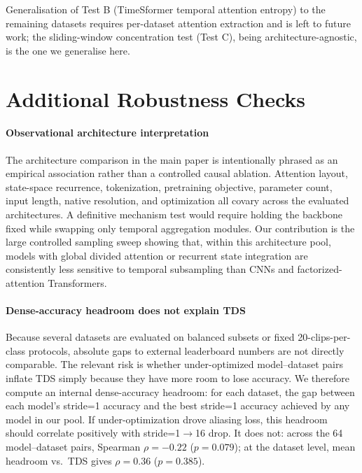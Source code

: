 \documentclass[a4paper, 10pt, conference, onecolumn]{ieeeconf}
\newcommand{\TDS}{\textsc{TDS}}
\begin{document}
Generalisation of Test B (TimeSformer temporal attention entropy) to the remaining datasets requires per-dataset attention extraction and is left to future work; the sliding-window concentration test (Test C), being architecture-agnostic, is the one we generalise here.

\section{Additional Robustness Checks}
\label{sec:sup_extra_checks}

\paragraph{Observational architecture interpretation}
The architecture comparison in the main paper is intentionally phrased as an empirical association rather than a controlled causal ablation. Attention layout, state-space recurrence, tokenization, pretraining objective, parameter count, input length, native resolution, and optimization all covary across the evaluated architectures. A definitive mechanism test would require holding the backbone fixed while swapping only temporal aggregation modules. Our contribution is the large controlled sampling sweep showing that, within this architecture pool, models with global divided attention or recurrent state integration are consistently less sensitive to temporal subsampling than CNNs and factorized-attention Transformers.

\paragraph{Dense-accuracy headroom does not explain \TDS{}}
Because several datasets are evaluated on balanced subsets or fixed 20-clips-per-class protocols, absolute gaps to external leaderboard numbers are not directly comparable. The relevant risk is whether under-optimized model--dataset pairs inflate \TDS{} simply because they have more room to lose accuracy. We therefore compute an internal dense-accuracy headroom: for each dataset, the gap between each model's stride=1 accuracy and the best stride=1 accuracy achieved by any model in our pool. If under-optimization drove aliasing loss, this headroom should correlate positively with stride=1$\to$16 drop. It does not: across the 64 model--dataset pairs, Spearman $\rho=-0.22$ ($p=0.079$); at the dataset level, mean headroom vs.\ \TDS{} gives $\rho=0.36$ ($p=0.385$).
\end{document}
